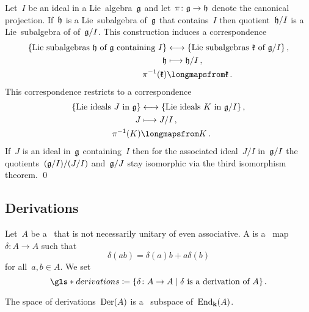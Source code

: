 \begin{proposition}
  \label{correspondence theorem!for Lie algebras}
  Let~$I$ be an ideal in a Lie~algebra~$\mathfrak{g}$ and let~$\pi \colon \mathfrak{g} \to \mathfrak{h}$ denote the canonical projection.
  If~$\mathfrak{h}$ is a Lie~subalgebra of~$\mathfrak{g}$ that contains~$I$ then quotient~$\mathfrak{h}/I$ is a Lie~subalgebra of of~$\mathfrak{g}/I$.
  This construction induces a {\onetoone} correspondence
  \begin{align*}
    \{ \text{Lie~subalgebras~$\hlie$ of~$\glie$ containing~$I$} \}
    &\longleftrightarrow
    \{ \text{Lie~subalgebras~$\klie$ of~$\glie/I$} \} \,,
    \\
    \hlie
    &\longmapsto
    \hlie/I \,,
    \\
    \pi^{-1}(\klie)
    &\longmapsfrom
    \klie \,.
  \end{align*}
  This correspondence restricts to a {\onetoone} correspondence
  \begin{align*}
    \{ \text{Lie~ideals~$J$ in~$\glie$} \}
    &\longleftrightarrow
    \{ \text{Lie~ideals~$K$ in~$\glie/I$} \} \,,
    \\
    J
    &\longmapsto
    J/I \,,
    \\
    \pi^{-1}(K)
    &\longmapsfrom
    K \,.
  \end{align*}
  If~$J$ is an ideal in~$\mathfrak{g}$ containing~$I$ then for the associated ideal~$J/I$ in~$\mathfrak{g}/I$ the quotients~$(\mathfrak{g}/I)/(J/I)$ and~$\mathfrak{g}/J$ stay isomorphic via the third isomorphism theorem.
  \qed
\end{proposition}





\subsection{Derivations}


\begin{definition}
  Let~$A$ be a~{\algebra{$\kf$}} that is not necessarily unitary of even associative.
  A  is a~{\linear{$\kf$}} map~$\delta \colon A \to A$ such that
  \[
    \delta(ab)
    =
    \delta(a) b + a \delta(b)
  \]
  for all~$a, b \in A$.
  We set
  \[
    \gls*{derivations}
    \defined
    \{
      \delta
      \colon
      A
      \to
      A
    \suchthat
      \text{$\delta$ is a derivation of~$A$}
    \}  \,.
  \]
\end{definition}


\begin{remark}
  The space of derivations~$\operatorname{Der}(A)$ is a~{\linear{$\kf$}} subspace of~$\operatorname{End}_{\mathbf{k}}(A)$.
\end{remark}


